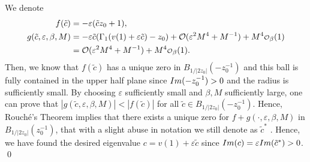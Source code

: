 \documentclass[11pt,reqno]{amsproc}
\def\eps{\varepsilon}
\def\Im{{\rm Im}}
\newcommand{\rmL}{\mathrm{L}}
\newcommand\smallO{
  \mathchoice
    {{\scriptstyle\mathcal{O}}}%
    {{\scriptstyle\mathcal{O}}}%
    {{\scriptscriptstyle\mathcal{O}}}%
    {\scalebox{.7}{$\scriptscriptstyle\mathcal{O}$}}%
  }
\theoremstyle{definition}
\theoremstyle{definition}
\numberwithin{equation}{section}
\begin{document}
We denote
\begin{align}
f(\tilde c)&=-\eps(\tilde c z_0+1), \\
g(\tilde c, \eps,\beta,M)&=-\eps \tilde c (\Gamma_1(v(1)+\eps\tilde c)-z_0)+\mathcal{O}(\eps^2 M^4+M^{-1})+ M^4\smallO_\beta(1) \\ & 
= \mathcal{O}(\eps^2 M^4+M^{-1})+ M^4\smallO_\beta(1).
\end{align}
Then, we know that  $f(\tilde c)$ has a unique zero in $B_{1/|2z_0|}(- z_0^{-1})$ and this ball is 
 fully contained in the upper half plane since $\Im(-z_0^{-1})>0$ and the radius is sufficiently small. By choosing $\eps$ sufficiently small and $\beta,M$ sufficiently large, one can prove that $|g(\tilde c,\eps,\beta,M)|<|f(\tilde c)|$ for all $\tilde c\in B_{1/|2z_0|}(- z_0^{-1})$. Hence, Rouché's Theorem implies that there exists a unique zero for $f+g(\cdot,\eps,\beta,M)$ in $B_{1/|2z_0|}(z_0^{-1})$, that with a slight abuse in notation we still denote as $\tilde c^*$ . Hence, we have found the desired eigenvalue $c=v(1)+\eps \tilde c$ since  $\Im(c)=\eps \Im(\tilde c^*)>0 $.
\qed 

\end{document}
